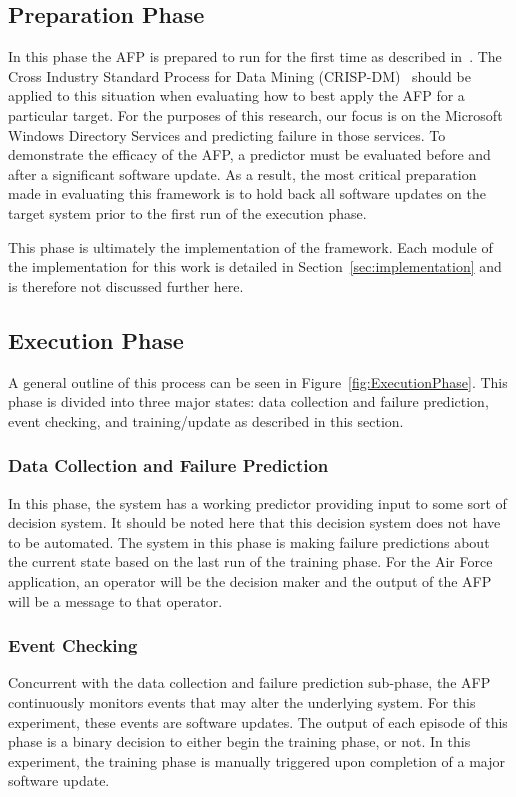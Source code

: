 \subsection{Preparation Phase}
In this phase the AFP is prepared to run for the first time as described
in~\cite{irrera2015}.  The Cross Industry Standard Process for Data Mining
(CRISP-DM)~\cite{crispdm} should be applied to this situation when evaluating
how to best apply the AFP for a particular target.  For the purposes of this
research, our focus is on the Microsoft Windows Directory Services and
predicting failure in those services.  To demonstrate the efficacy of the AFP,
a predictor must be evaluated before and after a significant software update.
As a result, the most critical preparation made in evaluating this framework is
to hold back all software updates on the target system prior to the first run
of the execution phase.  

This phase is ultimately the implementation of the framework.  Each module of
the implementation for this work is detailed in
Section~\ref{sec:implementation} and is therefore not discussed further here.  

\subsection{Execution Phase}
A general outline of this process can be seen in
Figure~\ref{fig:ExecutionPhase}.  This phase is divided into three major
states: data collection and failure prediction, event checking, and
training/update as described in this section.

\figExecutionPhase{2.5in}

\subsubsection{Data Collection and Failure Prediction}
In this phase, the system has a working predictor providing input to some sort
of decision system.  It should be noted here that this decision system does not
have to be automated.  The system in this phase is making failure predictions
about the current state based on the last run of the training phase.  For the
Air Force application, an operator will be the decision maker and the output of
the AFP will be a message to that operator.  

\subsubsection{Event Checking}
Concurrent with the data collection and failure prediction sub-phase, the AFP
continuously monitors events that may alter the underlying system.  For this
experiment, these events are software updates.  The output of each episode of
this phase is a binary decision to either begin the training phase, or not.  In
this experiment, the training phase is manually triggered upon completion of a
major software update.

